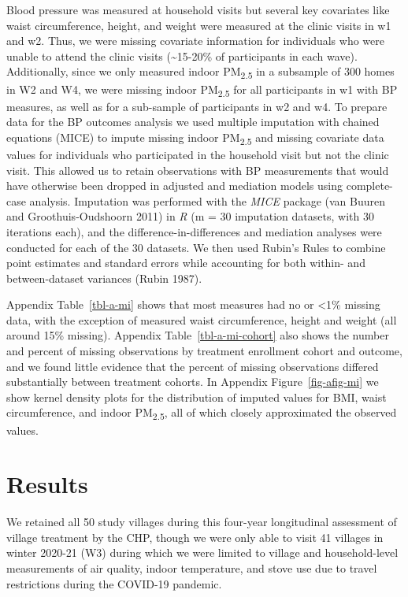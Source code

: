 \documentclass[
  letterpaper,
  DIV=11,
  numbers=noendperiod]{scrartcl}
\begin{document}
Blood pressure was measured at household visits but several key
covariates like waist circumference, height, and weight were measured at
the clinic visits in w1 and w2. Thus, we were missing covariate
information for individuals who were unable to attend the clinic visits
(\textasciitilde15-20\% of participants in each wave). Additionally,
since we only measured indoor PM\textsubscript{2.5} in a subsample of
300 homes in W2 and W4, we were missing indoor PM\textsubscript{2.5} for
all participants in w1 with BP measures, as well as for a sub-sample of
participants in w2 and w4. To prepare data for the BP outcomes analysis
we used multiple imputation with chained equations (MICE) to impute
missing indoor PM\textsubscript{2.5} and missing covariate data values
for individuals who participated in the household visit but not the
clinic visit. This allowed us to retain observations with BP
measurements that would have otherwise been dropped in adjusted and
mediation models using complete-case analysis. Imputation was performed
with the \emph{MICE} package (van Buuren and Groothuis-Oudshoorn 2011)
in \emph{R} (m = 30 imputation datasets, with 30 iterations each), and
the difference-in-differences and mediation analyses were conducted for
each of the 30 datasets. We then used Rubin's Rules to combine point
estimates and standard errors while accounting for both within- and
between-dataset variances (Rubin 1987).

Appendix  Table~\ref{tbl-a-mi} shows that most
measures had no or \textless1\% missing data, with the exception of
measured waist circumference, height and weight (all around 15\%
missing). Appendix Table~\ref{tbl-a-mi-cohort} also shows the number and
percent of missing observations by treatment enrollment cohort and
outcome, and we found little evidence that the percent of missing
observations differed substantially between treatment cohorts. In
Appendix Figure~\ref{fig-afig-mi} we show kernel density plots for the
distribution of imputed values for BMI, waist circumference, and indoor
PM\textsubscript{2.5}, all of which closely approximated the observed
values.

\section{Results}\label{results-1}

We retained all 50 study villages during this four-year longitudinal
assessment of village treatment by the CHP, though we were only able to
visit 41 villages in winter 2020-21 (W3) during which we were limited to
village and household-level measurements of air quality, indoor
temperature, and stove use due to travel restrictions during the
COVID-19 pandemic.
\end{document}
